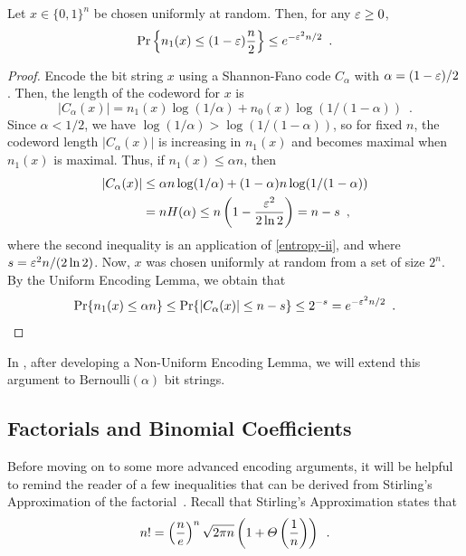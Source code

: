 \documentclass[format=acmsmall, review=false, screen=true]{acmart}
\begin{document}
\begin{thm}
  Let $x\in\{0,1\}^n$ be chosen uniformly at random. Then, for any
  $\varepsilon \geq 0$,
  \[
    \Pr\left\{n_1(x) \leq (1-\varepsilon)\frac{n}{2}\right\} 
    \le e^{-\varepsilon^2n/2} \enspace .
  \]
\end{thm}

\begin{proof}
  Encode the bit string $x$ using a Shannon-Fano code $C_\alpha$ with
  $\alpha=(1-\varepsilon)/2$. 
  Then, the length of the codeword for $x$ is
  \[
    |C_\alpha(x)| = n_1(x)\log(1/\alpha) + n_0(x)\log (1/(1-\alpha))
    \enspace .
  \]
  Since $\alpha < 1/2$, we have $\log(1/\alpha) > \log(1/(1-\alpha))$, 
  so for fixed $n$, the codeword length $|C_\alpha(x)|$ is 
  increasing in $n_1(x)$ and
  becomes maximal when $n_1(x)$ is maximal. 
    Thus, if $n_1(x) \le \alpha n$,
  then
  \begin{align*}
    |C_\alpha(x)| & \le \alpha n\log(1/\alpha) + 
    (1-\alpha)n\log(1/(1-\alpha))\\
                  & = n H(\alpha) \le n\left(1-\frac{\varepsilon^2}{2\ln 2}\right) = n - s \enspace ,
  \end{align*}
  where the second inequality is an application of \eqref{entropy-ii},
  and where $s = \varepsilon^2 n/(2 \ln 2)$.  Now, $x$ was chosen uniformly at
  random from a set of size $2^n$. By the Uniform Encoding Lemma, we
  obtain that
  \[
    \Pr\{n_1(x) \leq \alpha n\} \le \Pr\{|C_\alpha(x)| \le n - s\} \le 2^{-s} = e^{-\varepsilon^2n/2} \enspace . 
  \]
\end{proof}
In , after developing a Non-Uniform Encoding Lemma,
we will extend this argument to $\mathrm{Bernoulli}(\alpha)$ bit
strings. 

\subsection{Factorials and Binomial Coefficients}

Before moving on to some more advanced encoding arguments, it will be
helpful to remind the reader of a few inequalities that can be derived
from Stirling's Approximation of the factorial~\cite{robbins:stirling}.  
Recall that Stirling's Approximation states that
\begin{equation}
  n! = \left(\frac{n}{e}\right)^n\sqrt{2\pi n}\left(1+\varTheta\left(\frac{1}{n}\right)\right) \enspace .
  \eqlabel{stirling}
\end{equation}
\end{document}
